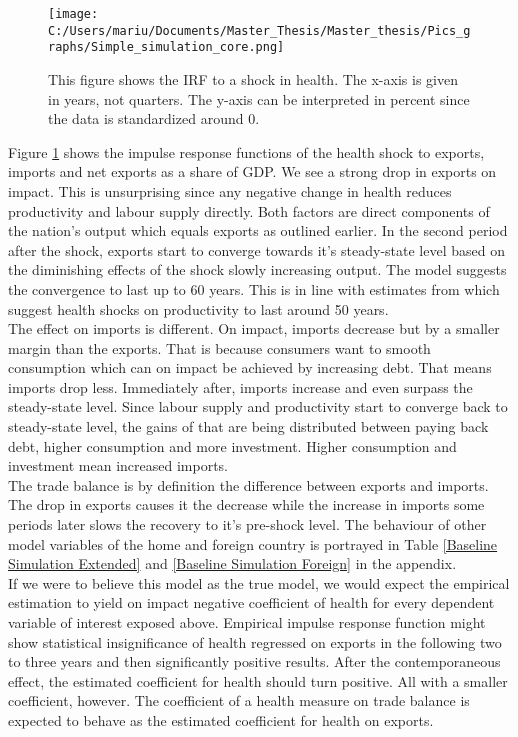 \documentclass{article}
\begin{document}
\begin{figure}[!ht]
\begin{center}
\begin{minipage}[t]{0.8\textwidth}
\texttt{[image: C:/Users/mariu/Documents/Master\_Thesis/Master\_thesis/Pics\_graphs/Simple\_simulation\_core.png]}\\
\caption{This figure shows the IRF to a shock in health. The x-axis is given in years, not quarters. The y-axis can be interpreted in percent since the data is standardized around 0. \label{Baseline Simulation}}
\end{minipage}
\end{center}
\end{figure}

Figure \ref{Baseline Simulation} shows the impulse response functions of the health shock to exports, imports and net exports as a share of GDP. We see a strong drop in exports on impact. This is unsurprising since any negative change in health reduces productivity and labour supply directly. Both factors are direct components of the nation's output which equals exports as outlined earlier. In the second period after the shock, exports start to converge towards it's steady-state level based on the diminishing effects of the shock slowly increasing output. The model suggests the convergence to last up to 60 years. This is in line with estimates from \cite{ashraf2008does} which suggest health shocks on productivity to last around 50 years.\\
The effect on imports is different. On impact, imports decrease but by a smaller margin than the exports. That is because consumers want to smooth consumption which can on impact be achieved by increasing debt. That means imports drop less. Immediately after, imports increase and even surpass the steady-state level. Since labour supply and productivity start to converge back to steady-state level, the gains of that are being distributed between paying back debt, higher consumption and more investment. Higher consumption and investment mean increased imports.\\
The trade balance is by definition the difference between exports and imports. The drop in exports causes it the decrease while the increase in imports some periods later slows the recovery to it's pre-shock level. The behaviour of other model variables of the home and foreign country is portrayed in Table \ref{Baseline Simulation Extended} and \ref{Baseline Simulation Foreign} in the appendix. \\
If we were to believe this model as the true model, we would expect the empirical estimation to yield on impact negative coefficient of health for every dependent variable of interest exposed above. Empirical impulse response function might show statistical insignificance of health regressed on exports in the following two to three years and then significantly positive results. After the contemporaneous effect, the estimated coefficient for health should turn positive. All with a smaller coefficient, however. The coefficient of a health measure on trade balance is expected to behave as the estimated coefficient for health on exports.
\end{document}
